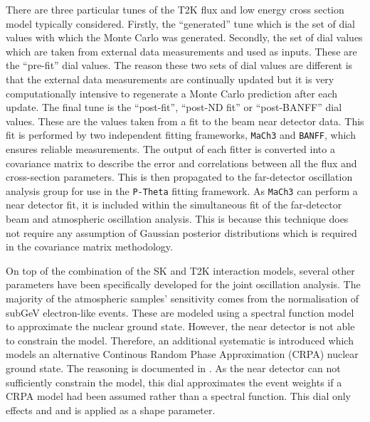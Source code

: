 
There are three particular tunes of the T2K flux and low energy cross section model typically considered. Firstly, the ``generated'' tune which is the set of dial values with which the Monte Carlo was generated. Secondly, the set of dial values which are taken from external data measurements and used as inputs. These are the ``pre-fit'' dial values. The reason these two sets of dial values are different is that the external data measurements are continually updated but it is very computationally intensive to regenerate a Monte Carlo prediction after each update. The final tune is the ``post-fit'', ``post-ND fit'' or ``post-BANFF'' dial values. These are the values taken from a fit to the beam near detector data. This fit is performed by two independent fitting frameworks, \texttt{MaCh3} and \texttt{BANFF}, which ensures reliable measurements. The output of each fitter is converted into a covariance matrix to describe the error and correlations between all the flux and cross-section parameters. This is then propagated to the far-detector oscillation analysis group for use in the \texttt{P-Theta} fitting framework. As \texttt{MaCh3} can perform a near detector fit, it is included within the simultaneous fit of the far-detector beam and atmospheric oscillation analysis. This is because this technique does not require any assumption of Gaussian posterior distributions which is required in the covariance matrix methodology.

On top of the combination of the SK and T2K interaction models, several other parameters have been specifically developed for the joint oscillation analysis. The majority of the atmospheric samples' \dcp sensitivity comes from the normalisation of subGeV electron-like events. These are modeled using a spectral function model to approximate the nuclear ground state. However, the near detector is not able to constrain the model. Therefore, an additional systematic is introduced which models an alternative Continous Random Phase Approximation (CRPA) nuclear ground state. The reasoning is documented in \cite{t2k_tn_422}. As the near detector can not sufficiently constrain the model, this dial approximates the event weights if a CRPA model had been assumed rather than a spectral function. This dial only effects  and  and is applied as a shape parameter.

